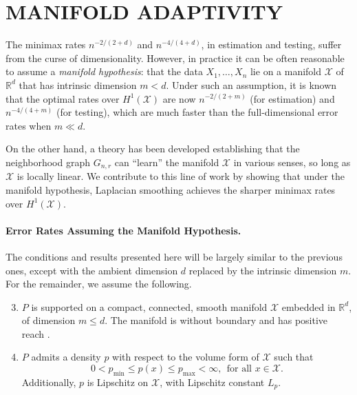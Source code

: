 \documentclass[twoside]{article}
\newcommand{\Reals}{\mathbb{R}}
\newcommand{\1}{\mathbf{1}}
\newcommand{\Rd}{\Reals^d}
\newcommand{\Xset}{\mathcal{X}}
\theoremstyle{definition}
\theoremstyle{remark}
\begin{document}
\section{MANIFOLD ADAPTIVITY}
\label{sec:manifold_adaptivity}

The minimax rates $n^{-2/(2 + d)}$ and $n^{-4/(4 + d)}$, in estimation and testing, suffer from the curse of dimensionality. However, in practice it can be often reasonable to assume a \emph{manifold hypothesis}: that the data $X_1,\ldots,X_n$ lie on a manifold $\Xset$ of $\Rd$ that has intrinsic dimension $m < d$. Under such an assumption, it is known \citep{bickel2007,ariascastro2018} that the optimal rates over $H^1(\Xset)$ are now $n^{-2/(2 + m)}$ (for estimation) and $n^{-4/(4 + m)}$ (for testing), which are much faster than the full-dimensional error rates when $m \ll d$. 


On the other hand, a theory has been developed \citep{belkin03,belkin05,niyogi2013} establishing that the neighborhood graph $G_{n,r}$ can ``learn'' the manifold $\Xset$ in various senses, so long as $\Xset$ is locally linear. We contribute to this line of work by showing that under the manifold hypothesis, Laplacian smoothing achieves the sharper minimax rates over $H^1(\Xset)$.

\paragraph{Error Rates Assuming the Manifold Hypothesis.}

The conditions and results presented here will be largely similar to the previous ones, except with the ambient dimension $d$ replaced by the intrinsic dimension $m$. For the remainder, we assume the following.
\begin{enumerate}[label=(P\arabic*)]
	\setcounter{enumi}{2}
	\item 
	\label{asmp:domain_manifold}
	$P$ is supported on a compact, connected, smooth manifold $\Xset$ embedded in $\Rd$, of dimension $m \leq d$. The manifold is without boundary and has positive reach \citep{federer1959}.
	\item 
	\label{asmp:density_manifold} 
  $P$ admits a density $p$ with respect to the volume form of $\Xset$ such that 
	\begin{equation*}
	0 < p_{\min} \leq p(x) \leq p_{\max} < \infty, ~~\textrm{for all $x \in \Xset$}. 
	\end{equation*}
	Additionally, $p$ is Lipschitz on $\Xset$, with Lipschitz constant $L_p$.
\end{enumerate}
\end{document}
